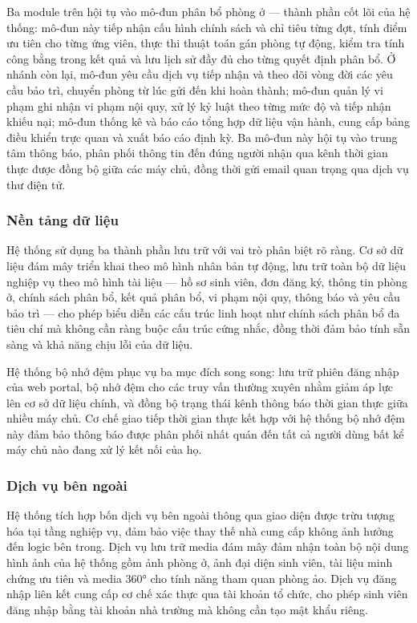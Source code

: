 \documentclass[../DoAn.tex]{subfiles}
\begin{document}
Ba module trên hội tụ vào mô-đun phân bổ phòng ở --- thành phần cốt lõi của hệ
thống: mô-đun này tiếp nhận cấu hình chính sách và chỉ tiêu từng đợt, tính điểm
ưu tiên cho từng ứng viên, thực thi thuật toán gán phòng tự động, kiểm tra tính
công bằng trong kết quả và lưu lịch sử đầy đủ cho từng quyết định phân bổ. Ở
nhánh còn lại, mô-đun yêu cầu dịch vụ tiếp nhận và theo dõi vòng đời các yêu
cầu bảo trì, chuyển phòng từ lúc gửi đến khi hoàn thành; mô-đun quản lý vi phạm
ghi nhận vi phạm nội quy, xử lý kỷ luật theo từng mức độ và tiếp nhận khiếu nại;
mô-đun thống kê và báo cáo tổng hợp dữ liệu vận hành, cung cấp bảng điều khiển
trực quan và xuất báo cáo định kỳ. Ba mô-đun này hội tụ vào trung tâm thông báo,
phân phối thông tin đến đúng người nhận qua kênh thời gian thực được đồng bộ
giữa các máy chủ, đồng thời gửi email quan trọng qua dịch vụ thư điện tử.

\subsubsection*{Nền tảng dữ liệu}

Hệ thống sử dụng ba thành phần lưu trữ với vai trò phân biệt rõ ràng. Cơ sở dữ
liệu đám mây triển khai theo mô hình nhân bản tự động, lưu trữ toàn bộ dữ liệu
nghiệp vụ theo mô hình tài liệu --- hồ sơ sinh viên, đơn đăng ký, thông tin
phòng ở, chính sách phân bổ, kết quả phân bổ, vi phạm nội quy, thông báo và
yêu cầu bảo trì --- cho phép biểu diễn các cấu trúc linh hoạt như chính sách
phân bổ đa tiêu chí mà không cần ràng buộc cấu trúc cứng nhắc, đồng thời đảm
bảo tính sẵn sàng và khả năng chịu lỗi của dữ liệu.

Hệ thống bộ nhớ đệm phục vụ ba mục đích song song: lưu trữ phiên đăng nhập của
web portal, bộ nhớ đệm cho các truy vấn thường xuyên nhằm giảm áp lực lên cơ sở
dữ liệu chính, và đồng bộ trạng thái kênh thông báo thời gian thực giữa nhiều
máy chủ. Cơ chế giao tiếp thời gian thực kết hợp với hệ thống bộ nhớ đệm này
đảm bảo thông báo được phân phối nhất quán đến tất cả người dùng bất kể máy chủ
nào đang xử lý kết nối của họ.

\subsubsection*{Dịch vụ bên ngoài}

Hệ thống tích hợp bốn dịch vụ bên ngoài thông qua giao diện được trừu tượng hóa
tại tầng nghiệp vụ, đảm bảo việc thay thế nhà cung cấp không ảnh hưởng đến logic
bên trong. Dịch vụ lưu trữ media đám mây đảm nhận toàn bộ nội dung hình ảnh của
hệ thống gồm ảnh phòng ở, ảnh đại diện sinh viên, tài liệu minh chứng ưu tiên và
media 360° cho tính năng tham quan phòng ảo. Dịch vụ đăng nhập liên kết cung cấp
cơ chế xác thực qua tài khoản tổ chức, cho phép sinh viên đăng nhập bằng tài
khoản nhà trường mà không cần tạo mật khẩu riêng.
\end{document}
